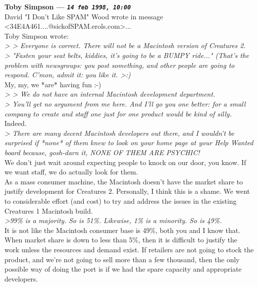 \documentclass[11pt,twoside,a4paper]{article}
\begin{document}
\begin{multicols*}{2}
 
		
	
		
\textbf{Toby Simpson --- \emph{\texttt{14 feb 1998, 10:00}}}~\\

David "I Don't Like SPAM" Wood wrote in message <34E4A461....@sickofSPAM.erols.com>...~\\

Toby Simpson wrote:~\\
\emph{> > Everyone is correct. There will not be a Macintosh version of Creatures 2.}~\\
\emph{> "Fasten your seat belts, kiddies, it's going to be a BUMPY ride..." (That's the problem with newsgroups: you post something, and other people are going to respond. C'mon, admit it: you like it. >:)}~\\

My, my, we *are* having fun :-)~\\

\emph{> >  We do not have an internal Macintosh development department.}~\\
\emph{> You'll get no argument from me here. And I'll go you one better: for a small company to create and staff one just for one product would be kind of silly.}~\\

Indeed.~\\

\emph{> There are many decent Macintosh developers out there, and I wouldn't be surprised if *none* of them knew to look on your home page at your Help Wanted board because, gosh-darn it, NONE OF THEM ARE PSYCHIC!}~\\

We don't just wait around expecting people to knock on our door, you know. If we want staff, we do actually look for them.~\\

As a mass consumer machine, the Macintosh doesn't have the market share to justify development for Creatures 2. Personally, I think this is a shame. We went to considerable effort (and cost) to try and address the issues in the existing Creatures 1 Macintosh build.~\\

\emph{>99\% is a majority. So is 51\%. Likewise, 1\% is a minority. So is 49\%.}~\\

It is not like the Macintosh consumer base is 49\%, both you and I know that. When market share is down to less than 5\%, then it is difficult to justify the work unless the resources and demand exist. If retailers are not going to stock the product, and we're not going to sell more than a few thousand, then the only possible way of doing the port is if we had the spare capacity and appropriate developers.~\\


\end{multicols*}
\end{document}
